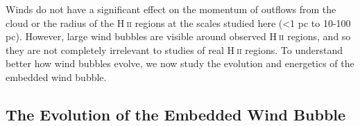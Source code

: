 \documentclass[a4paper,fleqn,usenatbib]{mnras}
\newcommand{\Msolar}{M$_{\odot}$\xspace}
\newcommand{\HII}{H$~$\textsc{ii}\xspace}
\begin{document}
%

Winds do not have a significant effect on the momentum of outflows from the cloud or the radius of the \HII regions at the scales studied here (<1 pc to 10-100 pc). However, large wind bubbles are visible around observed \HII regions, and so they are not completely irrelevant to studies of real \HII regions. To understand better how wind bubbles evolve, we now study the evolution and energetics of the embedded wind bubble.

\subsection{The Evolution of the Embedded Wind Bubble}
\label{results:evolutionwindbubble}
\end{document}
